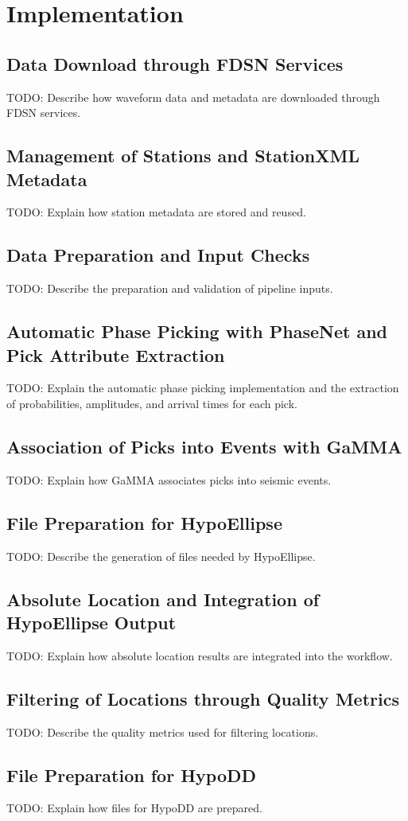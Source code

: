 \chapter{Implementation}

\section{Data Download through FDSN Services}
TODO: Describe how waveform data and metadata are downloaded through FDSN services.

\section{Management of Stations and StationXML Metadata}
TODO: Explain how station metadata are stored and reused.

\section{Data Preparation and Input Checks}
TODO: Describe the preparation and validation of pipeline inputs.

\section{Automatic Phase Picking with PhaseNet and Pick Attribute Extraction}
TODO: Explain the automatic phase picking implementation and the extraction of probabilities, amplitudes, and arrival times for each pick.

\section{Association of Picks into Events with GaMMA}
TODO: Explain how GaMMA associates picks into seismic events.

\section{File Preparation for HypoEllipse}
TODO: Describe the generation of files needed by HypoEllipse.

\section{Absolute Location and Integration of HypoEllipse Output}
TODO: Explain how absolute location results are integrated into the workflow.

\section{Filtering of Locations through Quality Metrics}
TODO: Describe the quality metrics used for filtering locations.

\section{File Preparation for HypoDD}
TODO: Explain how files for HypoDD are prepared.
